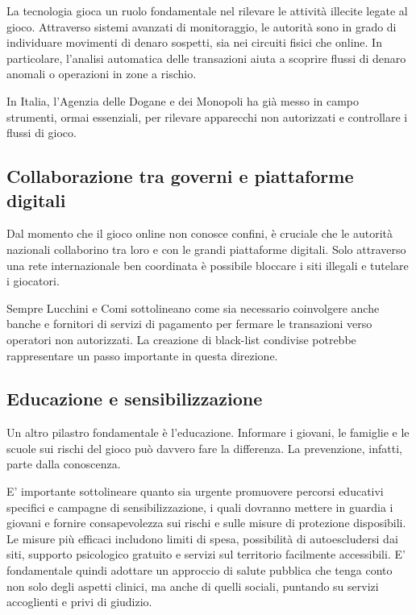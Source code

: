 \documentclass[a4paper,12pt]{article}
\begin{document}
La tecnologia gioca un ruolo fondamentale nel rilevare le attività illecite legate al gioco. Attraverso sistemi avanzati di monitoraggio, le autorità sono in grado di individuare movimenti di denaro sospetti, sia nei circuiti fisici che online. In particolare, l'analisi automatica delle transazioni aiuta a scoprire flussi di denaro anomali o operazioni in zone a rischio.

In Italia, l’Agenzia delle Dogane e dei Monopoli ha già messo in campo strumenti, ormai essenziali, per rilevare apparecchi non autorizzati e controllare i flussi di gioco.
\cite{lucchini2022socialcosts}

\subsection{Collaborazione tra governi e piattaforme digitali}

Dal momento che il gioco online non conosce confini, è cruciale che le autorità nazionali collaborino tra loro e con le grandi piattaforme digitali. Solo attraverso una rete internazionale ben coordinata è possibile bloccare i siti illegali e tutelare i giocatori.

Sempre Lucchini e Comi sottolineano come sia necessario coinvolgere anche banche e fornitori di servizi di pagamento per fermare le transazioni verso operatori non autorizzati. La creazione di black-list condivise potrebbe rappresentare un passo importante in questa direzione.
\cite{lucchini2022socialcosts}

\subsection{Educazione e sensibilizzazione}

Un altro pilastro fondamentale è l’educazione. Informare i giovani, le famiglie e le scuole sui rischi del gioco può davvero fare la differenza. La prevenzione, infatti, parte dalla conoscenza.

E' importante sottolineare quanto sia urgente promuovere percorsi educativi specifici e campagne di sensibilizzazione, i quali dovranno mettere in guardia i giovani e fornire consapevolezza sui rischi e sulle misure di protezione disposibili. Le misure più efficaci includono limiti di spesa, possibilità di autoescludersi dai siti, supporto psicologico gratuito e servizi sul territorio facilmente accessibili. E' fondamentale quindi adottare un approccio di salute pubblica che tenga conto non solo degli aspetti clinici, ma anche di quelli sociali, puntando su servizi accoglienti e privi di giudizio.
 \cite{lucchini2022socialcosts}
\end{document}
